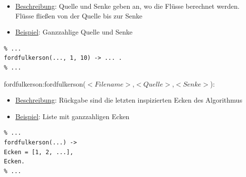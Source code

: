\documentclass[11pt]{article}
\begin{document}
    \begin{itemize}
        \item \underline{Beschreibung}: Quelle und Senke geben an, wo die Fl\"usse berechnet werden. Fl\"usse flie\ss{}en von der Quelle bis zur Senke
        \item \underline{Beispiel}: Ganzzahlige Quelle und Senke
    \end{itemize}
\begin{lstlisting}
% ...
fordfulkerson(..., 1, 10) -> ... .
% ...
\end{lstlisting}
    fordfulkerson:fordfulkerson($<Filename>$,$<Quelle>$,$<Senke>$):\\ 
    \begin{itemize}
        \item \underline{Beschreibung}: R\"uckgabe sind die letzten inspizierten Ecken des Algorithmus
        \item \underline{Beispiel}: Liste mit ganzzahligen Ecken
    \end{itemize}
\begin{lstlisting}
% ...
fordfulkerson(...) ->
Ecken = [1, 2, ...],
Ecken.
% ...
\end{lstlisting}
\end{document}
